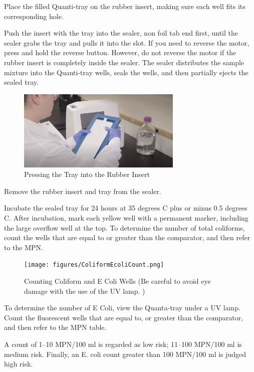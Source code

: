 \documentclass[12pt]{../SOP4_alpha}\usepackage[]{graphicx}\usepackage[]{xcolor}
\begin{document}
\NP Place the filled Quanti-tray on the rubber insert, making sure each well fits its corresponding hole.

\NP Push the insert with the tray into the sealer, non foil tab end first, until the sealer grabs the tray and pulls it into the slot. If you need to reverse the motor, press and hold the reverse button. However, do not reverse the motor if the rubber insert is completely inside the sealer.
The sealer distributes the sample mixture into the Quanti-tray wells, seals the wells, and then partially ejects the sealed tray.

\begin{figure}[h]
\includegraphics[width=0.7\textwidth]{figures/RubberInsert.png}
\caption{Pressing the Tray into the Rubber Insert}
\end{figure}

\NP Remove the rubber insert and tray from the sealer.

\NP Incubate the sealed tray for 24 hours at 35 degrees C plus or minus 0.5 degrees C.
\NP After incubation, mark each yellow well with a permanent marker, including the large overflow well at the top. To determine the number of total coliforms, count the wells that are equal to or greater than the comparator, and then refer to the MPN.

\begin{figure}[h]
\centering
\texttt{[image: figures/ColiformEcoliCount.png]}
\caption{Counting Coliform and E Coli Wells (Be careful to avoid eye damage with  the use of the UV lamp.  )}
\end{figure}

\NP To determine the number of E Coli, view the Quanta-tray under a UV lamp. Count the fluorescent wells that are equal to, or greater than the comparator, and then refer to the MPN table.

\clearpage

\NP A count of 1–10 MPN/100 ml is regarded as low risk; 11–100 MPN/100 ml is medium risk. Finally, an E. coli count greater than 100 MPN/100 ml is judged high risk.
\end{document}
